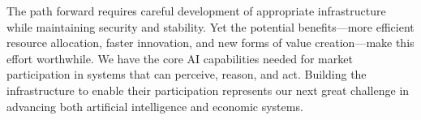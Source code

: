 \documentclass{article}
\begin{document}
The path forward requires careful development of appropriate infrastructure while maintaining security and stability. Yet the potential benefits—more efficient resource allocation, faster innovation, and new forms of value creation—make this effort worthwhile. We have the core AI capabilities needed for market participation in systems that can perceive, reason, and act. Building the infrastructure to enable their participation represents our next great challenge in advancing both artificial intelligence and economic systems.




\end{document}

